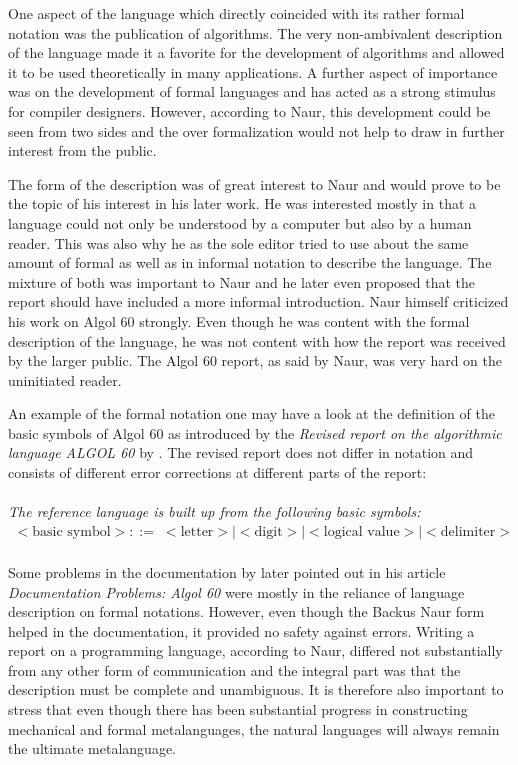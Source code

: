 \documentclass{article}
\begin{document}
One aspect of the language which directly coincided with its rather formal notation was the publication of algorithms. The very non-ambivalent description of the language made it a favorite for the development of algorithms and allowed it to be used theoretically in many applications. A further aspect of importance was on the development of formal languages and has acted as a strong stimulus for compiler designers. However, according to Naur, this development could be seen from two sides and the over formalization would not help to draw in further interest from the public.

The form of the description was of great interest to Naur and would prove to be the topic of his interest in his later work. He was interested mostly in that a language could not only be understood by a computer but also by a human reader. This was also why he as the sole editor tried to use about the same amount of formal as well as in informal notation to describe the language. The mixture of both was important to Naur and he later even proposed that the report should have included a more informal introduction. Naur himself criticized his work on Algol 60 strongly. Even though he was content with the formal description of the language, he was not content with how the report was received by the larger public. The Algol 60 report, as said by Naur, was very hard on the uninitiated reader.

An example of the formal notation one may have a look at the definition of the basic symbols of Algol 60 as introduced by the \textit{Revised report on the algorithmic language ALGOL 60} by \cite{Backus1963RevisedRO}. The revised report does not differ in notation and consists of different error corrections at different parts of the report:
\\ \\
\textit{The reference language is built up from the following basic symbols:}
\begin{equation} \label{eq5}
\begin{split}
<\text{basic symbol}> ::=&<\text{letter}>|<\text{digit}>|<\text{logical value}>|<\text{delimiter}> \\
\end{split}
\end{equation}

Some problems in the documentation by \citet{naur1963documentation} later pointed out in his article \textit{Documentation Problems: Algol 60} were mostly in the reliance of language description on formal notations. However, even though the Backus Naur form helped in the documentation, it provided no safety against errors. Writing a report on a programming language, according to Naur, differed not substantially from any other form of communication and the integral part was that the description must be complete and unambiguous. It is therefore also important to stress that even though there has been substantial progress in constructing mechanical and formal metalanguages, the natural languages will always remain the ultimate metalanguage.
\end{document}

